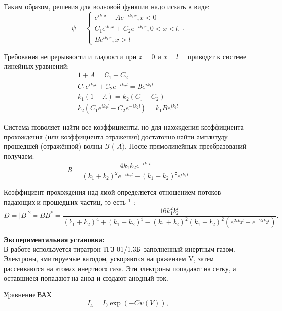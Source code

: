 \documentclass[a4paper, 12pt]{article}%
\begin{document}
	Таким образом, решения для волновой функции надо искать в виде:
	$$
	\psi=\left\{\begin{array}{c}
		e^{i k_1 x}+A e^{-i k_1 x}, x<0 \\
		C_1 e^{i k_1 x}+C_2 e^{-i k_1 x}, 0<x<l . \\
		B e^{i k_1 x}, x>l
	\end{array} .\right.
	$$
	
	Требования непрерывности и гладкости при $x=0$ и $x=l \quad$ приводят к системе линейных уравнений:
	$$
	\begin{gathered}
		1+A=C_1+C_2 \\
		C_1 e^{i k_2 l}+C_2 e^{-i k_2 l}=B e^{i k_1 l} \\
		k_1(1-A)=k_2\left(C_1-C_2\right) \\
		k_2\left(C_1 e^{i k_2 l}-C_2 e^{-i k_2 l}\right)=k_1 B e^{i k_1 l}
	\end{gathered}
	$$
	
	Система позволяет найти все коэффициенты, но для нахождения коэффициента прохождения (или коэффициента отражения) достаточно найти амплитуду прошедшей (отражённой) волны $B$ ( $A)$. После прямолинейных преобразований получаем:
	$$
	B=\frac{4 k_1 k_2 e^{-i k_1 l}}{\left(k_1+k_2\right)^2 e^{-i k_2 l}-\left(k_1-k_2\right)^2 e^{i k_1 l}}
	$$
	
	Коэффициент прохождения над ямой определяется отношением потоков падающих и прошедших частиц, то есть ${ }^1$ :
	$$
	D=|B|^2=B B^*=\frac{16 k_1^2 k_2^2}{\left(k_1+k_2\right)^4+\left(k_1-k_2\right)^4-\left(k_1+k_2\right)^2\left(k_1-k_2\right)^2\left(e^{2 i k_2 l}+e^{-2 i k_2 l}\right)} .
	$$
	
	\textbf{Экспериментальная установка: }\\
	
	В работе используется тиратрон ТГЗ-01/1.3Б, заполненный инертным газом. Электроны, эмитируемые катодом, ускоряются напряжением V, затем рассеиваются на атомах инертного газа. Эти электроны попадают на сетку, а оставшиеся попадают на анод и создают анодный ток.
	
	Уравнение ВАХ 
	\begin{equation}\label{3}
		I_\text{a} = I_0 \exp\left( - C w(V) \right),
	\end{equation}
\end{document}
